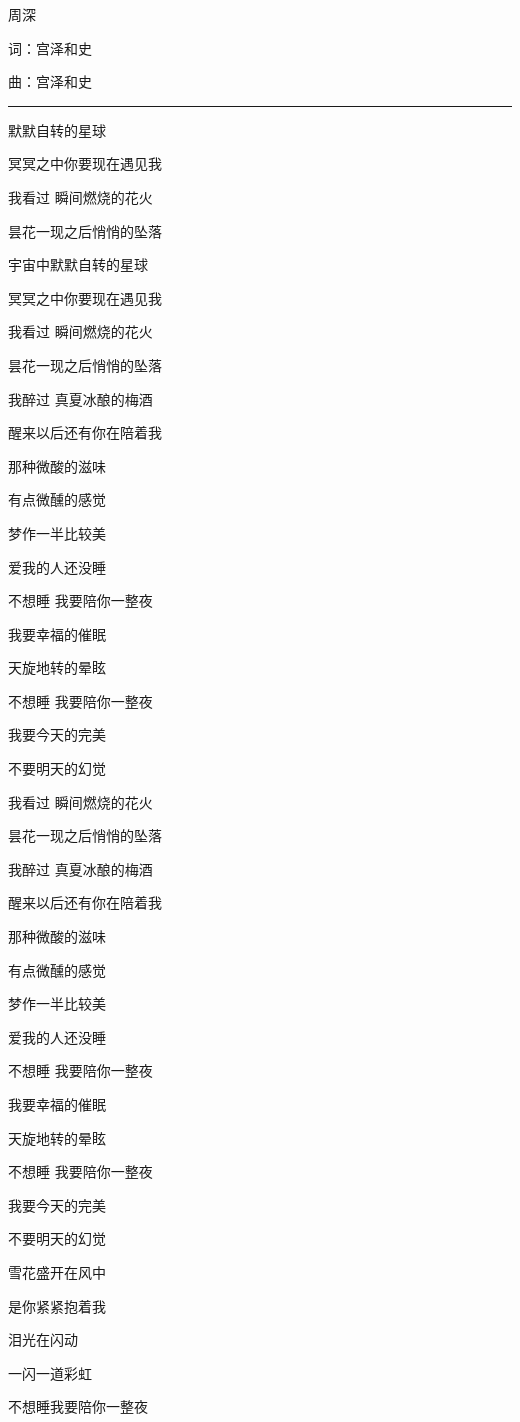 \documentclass[]{ctexbook}
\begin{document}
周深

词：宫泽和史

曲：宫泽和史

\begin{center}\rule{0.5\linewidth}{0.5pt}\end{center}

默默自转的星球

冥冥之中你要现在遇见我

我看过 瞬间燃烧的花火

昙花一现之后悄悄的坠落

宇宙中默默自转的星球

冥冥之中你要现在遇见我

我看过 瞬间燃烧的花火

昙花一现之后悄悄的坠落

我醉过 真夏冰酿的梅酒

醒来以后还有你在陪着我

那种微酸的滋味

有点微醺的感觉

梦作一半比较美

爱我的人还没睡

不想睡 我要陪你一整夜

我要幸福的催眠

天旋地转的晕眩

不想睡 我要陪你一整夜

我要今天的完美

不要明天的幻觉

我看过 瞬间燃烧的花火

昙花一现之后悄悄的坠落

我醉过 真夏冰酿的梅酒

醒来以后还有你在陪着我

那种微酸的滋味

有点微醺的感觉

梦作一半比较美

爱我的人还没睡

不想睡 我要陪你一整夜

我要幸福的催眠

天旋地转的晕眩

不想睡 我要陪你一整夜

我要今天的完美

不要明天的幻觉

雪花盛开在风中

是你紧紧抱着我

泪光在闪动

一闪一道彩虹

不想睡我要陪你一整夜
\end{document}
